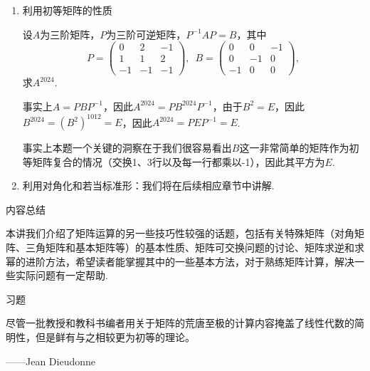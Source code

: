 \begin{enumerate}
    \item 利用初等矩阵的性质
          \begin{example}
              设$A$为三阶矩阵，$P$为三阶可逆矩阵，$P^{-1}AP=B$，其中
              \[P=\begin{pmatrix}
                      0 & 2 & -1 \\ 1 & 1 & 2 \\ -1 & -1 & -1
                  \end{pmatrix},\enspace B=\begin{pmatrix}
                      0 & 0 & -1 \\ 0 & -1 & 0 \\ -1 & 0 & 0
                  \end{pmatrix},\]
              求$A^{2024}$.
          \end{example}
          \begin{solution}
            事实上$A=PBP^{-1}$，因此$A^{2024}=PB^{2024}P^{-1}$，由于$B^2=E$，因此$B^{2024}=(B^2)^{1012}=E$，因此$A^{2024}=PEP^{-1}=E$.
          \end{solution}

          事实上本题一个关键的洞察在于我们很容易看出$B$这一非常简单的矩阵作为初等矩阵复合的情况（交换1、3行以及每一行都乘以-1），因此其平方为$E$.

    \item 利用对角化和若当标准形：我们将在后续相应章节中讲解.
\end{enumerate}

\vspace{2ex}
\centerline{\heiti \Large 内容总结}

本讲我们介绍了矩阵运算的另一些技巧性较强的话题，包括有关特殊矩阵（对角矩阵、三角矩阵和基本矩阵等）的基本性质、矩阵可交换问题的讨论、矩阵求逆和求幂的进阶方法，希望读者能掌握其中的一些基本方法，对于熟练矩阵计算，解决一些实际问题有一定帮助.

\vspace{2ex}
\centerline{\heiti \Large 习题}

\vspace{2ex}
{\kaishu 尽管⼀批教授和教科书编者⽤关于矩阵的荒唐⾄极的计算内容掩盖了线性代数的简明性，但是鲜有与之相较更为初等的理论。
}
\begin{flushright}
    ——Jean Dieudonne
\end{flushright}

